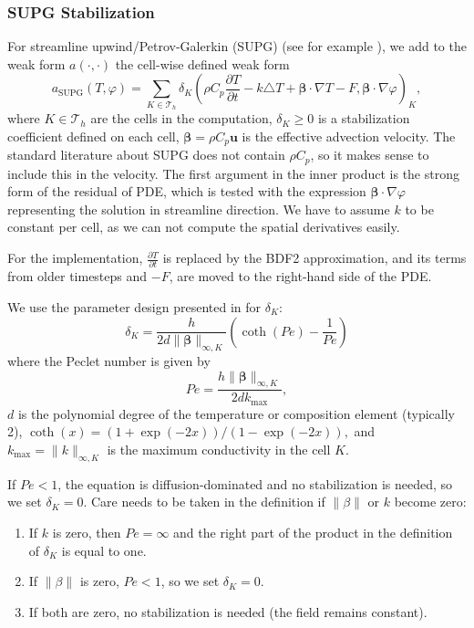 \documentclass{article}
\begin{document}
\subsubsection{SUPG Stabilization}

For streamline upwind/Petrov-Galerkin (SUPG) (see for example \cite{JohnKnobloch2006,dealiistep63}), we add to the weak form $a(\cdot,\cdot)$ the cell-wise defined weak form
\[
a_{\text{SUPG}} (T, \varphi) =
 \sum_{K \in \mathcal{T}_h}
  \delta_K \left( \rho C_p \frac{\partial T}{\partial t} - k \triangle T + \mathbf{\beta} \cdot \nabla T - F, \mathbf{\beta} \cdot \nabla \varphi \right)_K,
\]
where $K \in \mathcal{T}_h$ are the cells in the computation, $\delta_K \geq 0$ is a stabilization coefficient
defined on each cell, $\mathbf{\beta} = \rho C_p \mathbf{u}$ is the effective advection velocity.
The standard literature about SUPG does not contain $\rho C_p$, so it makes sense to include this in the
velocity.
The first argument in the inner product is the strong form of the residual of PDE, which
is tested with the expression $\mathbf{\beta} \cdot \nabla \varphi$ representing the solution in
streamline direction. We have to assume $k$ to be
constant per cell, as we can not compute the spatial derivatives easily.

For the implementation, $\frac{\partial T}{\partial t}$ is replaced by the BDF2 approximation, and its terms from older timesteps and $-F$, are moved to the right-hand side of the PDE.

We use the parameter design presented in \cite{JohnKnobloch2006} for $\delta_K$:
\[
 \delta_K = \frac{h}{2d\|\mathbf{\beta}\|_{\infty,K}} \left( \coth(Pe)-\frac{1}{Pe} \right)
\]
where the Peclet number is given by
\[
 Pe = \frac{ h \| \mathbf{\beta} \|_{\infty,K}}{2 d k_\text{max}},
\]
$d$ is the polynomial degree of the temperature or composition element (typically 2),
$
 \coth(x) = (1+\exp(-2x)) / (1-\exp(-2x)),
$
and $k_\text{max}=\| k \|_{\infty, K}$ is the maximum conductivity in the cell $K$.

If $Pe<1$, the equation is diffusion-dominated and no stabilization is needed, so we
set $\delta_K=0$. Care needs to be taken in the definition if $\| \beta \|$ or $k$ become zero:
\begin{enumerate}
\item If $k$ is zero, then $Pe=\infty$ and the right part of the product in the definition of $\delta_K$ is equal to one.
\item If $\| \beta \|$ is zero, $Pe < 1$, so we set $\delta_K=0$.
\item If both are zero, no stabilization is needed (the field remains constant).  
\end{enumerate}
\end{document}
